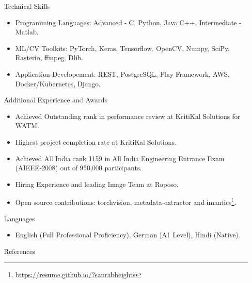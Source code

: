\documentclass[]{mcdowellcv}
\begin{document}
    \begin{cvsection}{Technical Skills}
        \begin{cvsubsection}{}{}{}    
            \begin{itemize}
                \item Programming Languages: Advanced - C, Python, Java C++. Intermediate - Matlab.
                \item ML/CV Toolkits: PyTorch, Keras, Tensorflow, OpenCV, Numpy, SciPy, Rasterio, ffmpeg, Dlib.
                \item Application Developement: REST, PostgreSQL, Play Framework, AWS, Docker/Kubernetes, Django.
            \end{itemize}
        \end{cvsubsection}
    \end{cvsection}
    
    \begin{cvsection}{Additional Experience and Awards}
        \begin{cvsubsection}{}{}{}    
            \begin{itemize}
                \item Achieved Outstanding rank in performance review at KritiKal Solutions for WATM.
                \item Highest project completion rate at KritiKal Solutions.
                \item Achieved All India rank 1159 in All India Engineering Entrance Exam (AIEEE-2008) out of 950,000 participants.
                \item Hiring Experience and leading Image Team at Roposo.
                \item Open source contributions: torchvision, metadata-extractor and imantics\footnote{\href{https://resume.github.io/?saurabheights}{https://resume.github.io/?saurabheights}}.
            \end{itemize}
        \end{cvsubsection}
    \end{cvsection}
    
    \begin{cvsection}{Languages}
        \begin{cvsubsection}{}{}{}    
            \begin{itemize}
                \item English (Full Professional Proficiency), German (A1 Level), Hindi (Native).
            \end{itemize}
        \end{cvsubsection}
    \end{cvsection}
    
        \begin{cvsection}{References}

         \printbibliography[heading=none]

    \end{cvsection}
    
\end{document}
